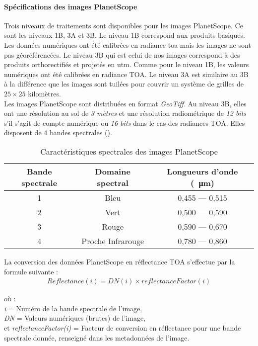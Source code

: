     \paragraph{Spécifications des images PlanetScope}

Trois niveaux de traitements sont disponibles pour les images PlanetScope. Ce sont les niveaux 1B, 3A et 3B. Le niveau 1B correspond aux produits basiques. Les données numériques ont 
été calibrées en radiance \acrshort{toa} mais les images ne sont pas géoréférencées. Le niveau 3B qui est celui de nos images correspond à des produits orthorectifiés et projetés en
\acrshort{utm}. Comme pour le niveau 1B, les valeurs numériques ont été calibrées en radiance TOA. Le niveau 3A est similaire au 3B à la différence que les images sont tuilées pour 
couvrir un système de grilles de $25\times25$ kilomètres.\\
Les images PlanetScope sont distribuées en format \emph{GeoTiff}. Au niveau 3B, elles ont une résolution au sol de \emph{3 mètres} et une résolution radiométrique de \emph{12 bits} s'il 
s'agit de compte numérique ou \emph{16 bits} dans le cas des radiances TOA. Elles disposent de 4 bandes spectrales (). 

\begin{table}[htbp]
\begin{center}
\caption{Caractéristiques spectrales des images PlanetScope}
\label{planetscope}
 \begin{tabular}{ccc}
  \hline
  Bande spectrale & Domaine spectral & Longueurs d'onde (\SI{}{\micro\meter})\\
  \hline
  1 & Bleu & 0,455 --- 0,515 \\
  2 & Vert & 0,500 --- 0,590 \\
  3 & Rouge & 0,590 --- 0,670 \\
  4 & Proche Infrarouge & 0,780 --- 0,860 \\ 
  \hline
 \end{tabular}
\end{center}
\end{table}

La conversion des données PlanetScope en réflectance TOA s'effectue par la formule suivante :
\begin{align}
   Reflectance (i) = DN(i) \times reflectanceFactor(i)
\end{align}

où :\\
\emph{i} = Numéro de la bande spectrale de l'image,\\
\emph{DN} = Valeurs numériques (brutes) de l'image,\\
et \emph{reflectanceFactor(i)} = Facteur de conversion en réflectance pour une bande spectrale donnée, renseigné dans les metadonnées de l'image.

